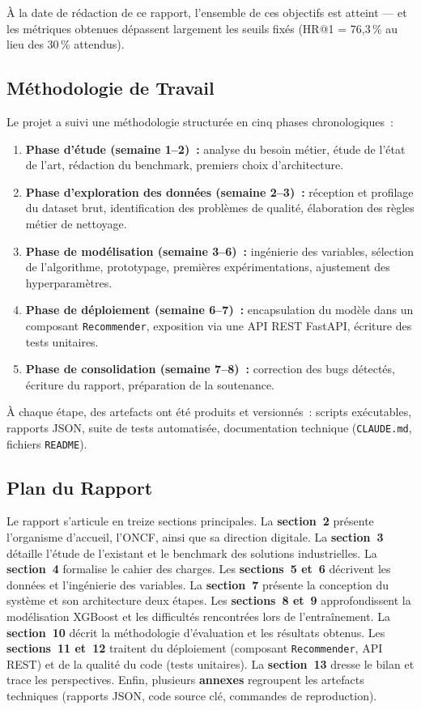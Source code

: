 \documentclass[11pt, a4paper]{article}
\begin{document}
À la date de rédaction de ce rapport, l'ensemble de ces objectifs est
atteint --- et les métriques obtenues dépassent largement les seuils
fixés (HR@1 = 76{,}3\,\% au lieu des 30\,\% attendus).

\subsection{Méthodologie de Travail}

Le projet a suivi une méthodologie structurée en cinq phases
chronologiques~:
\begin{enumerate}
\item \textbf{Phase d'étude (semaine 1--2)~:} analyse du besoin
    métier, étude de l'état de l'art, rédaction du benchmark, premiers
    choix d'architecture.
\item \textbf{Phase d'exploration des données (semaine 2--3)~:}
    réception et profilage du dataset brut, identification des problèmes
    de qualité, élaboration des règles métier de nettoyage.
\item \textbf{Phase de modélisation (semaine 3--6)~:} ingénierie
    des variables, sélection de l'algorithme, prototypage, premières
    expérimentations, ajustement des hyperparamètres.
\item \textbf{Phase de déploiement (semaine 6--7)~:} encapsulation
    du modèle dans un composant \texttt{Recommender}, exposition via une
    API REST FastAPI, écriture des tests unitaires.
\item \textbf{Phase de consolidation (semaine 7--8)~:} correction
    des bugs détectés, écriture du rapport, préparation de la
    soutenance.
\end{enumerate}

À chaque étape, des artefacts ont été produits et versionnés~: scripts
exécutables, rapports JSON, suite de tests automatisée, documentation
technique (\texttt{CLAUDE.md}, fichiers \texttt{README}).

\subsection{Plan du Rapport}

Le rapport s'articule en treize sections principales. La
\textbf{section~2} présente l'organisme d'accueil, l'ONCF, ainsi que sa
direction digitale. La \textbf{section~3} détaille l'étude de l'existant
et le benchmark des solutions industrielles. La \textbf{section~4}
formalise le cahier des charges. Les \textbf{sections~5 et~6} décrivent
les données et l'ingénierie des variables. La \textbf{section~7} présente
la conception du système et son architecture deux étapes. Les
\textbf{sections~8 et~9} approfondissent la modélisation XGBoost et les
difficultés rencontrées lors de l'entraînement. La \textbf{section~10}
décrit la méthodologie d'évaluation et les résultats obtenus. Les
\textbf{sections~11 et~12} traitent du déploiement (composant
\texttt{Recommender}, API REST) et de la qualité du code (tests
unitaires). La \textbf{section~13} dresse le bilan et trace les
perspectives. Enfin, plusieurs \textbf{annexes} regroupent les artefacts
techniques (rapports JSON, code source clé, commandes de reproduction).
\end{document}
